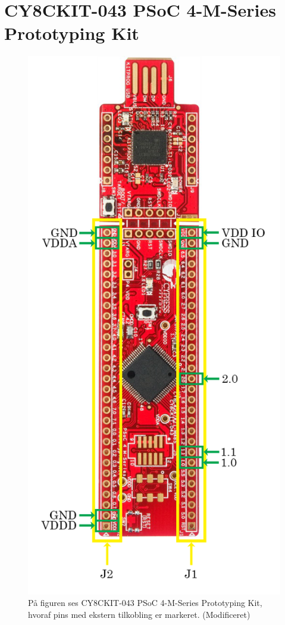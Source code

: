 \chapter{CY8CKIT-043 PSoC 4-M-Series Prototyping Kit}\vspace{-.75cm}\label{MCU_stor}
\begin{figure}[H]
	\centering
	\includegraphics[scale=1.8]{figures/qBilag/cy8ckit_PSoC_4200M.png}
	\caption{På figuren ses CY8CKIT-043 PSoC 4-M-Series Prototyping Kit, hvoraf pins med ekstern tilkobling er markeret. \citep{CYPRESS2016PSoC} (Modificeret)}
	\label{fig:bilag_MCU_stor}
\end{figure}